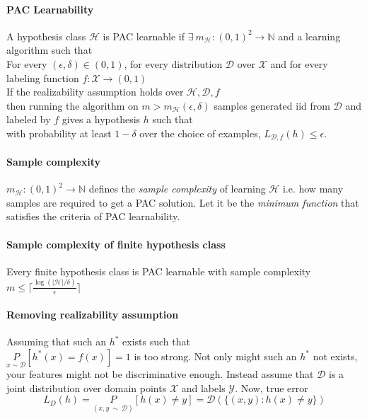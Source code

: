 \paragraph{PAC Learnability} A hypothesis class $\mathcal{H}$ is PAC learnable if $\exists~ m_{\mathcal{H}}: (0,1)^2 \to \mathbb{N}$ and a learning algorithm such that\\
For every $(\epsilon, \delta) \in (0,1)$, for every distribution $\mathcal{D}$ over $\mathcal{X}$ and for every labeling function $f: \mathcal{X} \to (0,1)$\\
If the realizability assumption holds over $\mathcal{H}, \mathcal{D}, f$\\
then running the algorithm on $m > m_{\mathcal{H}}(\epsilon, \delta)$ samples generated iid from $\mathcal{D}$ and labeled by $f$ gives a hypothesis $h$ such that \\
with probability at least $1-\delta$ over the choice of examples, $L_{\mathcal{D}, f}(h) \leq \epsilon$.

\paragraph{Sample complexity} $m_{\mathcal{H}}: (0,1)^2 \to \mathbb{N}$ defines the \textit{sample complexity} of learning $\mathcal{H}$ i.e. how many samples are required to get a PAC solution. Let it be the \textit{minimum function} that satisfies the criteria of PAC learnability.

\paragraph{Sample complexity of finite hypothesis class} Every finite hypothesis class is PAC learnable with sample complexity $ m \leq \lceil \frac{\log( |\mathcal{H}|/\delta)}{\epsilon} \rceil$

\paragraph{Removing realizability assumption} Assuming that such an $h^*$ exists such that \\
$\underset{x \sim \mathcal{D}}{P}[h^*(x) = f(x)] = 1$ is too strong. Not only might such an $h^*$ not exists, your features might not be discriminative enough. Instead assume that $\mathcal{D}$ is a joint distribution over domain points $\mathcal{X}$ and labels $\mathcal{Y}$.
Now, true error 
\[
	L_D(h) = \underset{(x,y~ \sim ~\mathcal{D})}{P}[h(x) \neq y] = \mathcal{D}(\{(x,y): h(x) \neq y\})
\]

